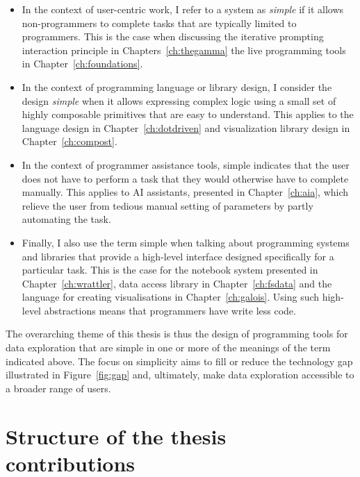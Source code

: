 \documentclass[fleqn,11pt]{report}
\theoremstyle{definition}
\newenvironment{nitemize}
{ \vspace{-0.4em}
  \begin{itemize}
    \setlength{\itemsep}{5pt}
    \setlength{\parskip}{0pt}
    \setlength{\parsep}{0pt} }
{ \end{itemize}
  \vspace{-0.4em} }
\begin{document}
\begin{nitemize}
\item In the context of user-centric work, I refer to a system as \emph{simple} if it allows
  non-programmers to complete tasks that are typically limited to programmers. This is the
  case when discussing the iterative prompting interaction principle in Chapters~\ref{ch:thegamma}
  the live programming tools in Chapter~\ref{ch:foundations}.

\item In the context of programming language or library design, I consider the design \emph{simple}
  when it allows expressing complex logic using a small set of highly composable primitives
  that are easy to understand. This applies to the language design in Chapter~\ref{ch:dotdriven}
  and visualization library design in Chapter~\ref{ch:compost}.

\item In the context of programmer assistance tools, simple indicates that the
  user does not have to perform a task that they would otherwise have to complete manually.
  This applies to AI assistants, presented in Chapter~\ref{ch:aia}, which relieve the user from
  tedious manual setting of parameters by partly automating the task.

\item Finally, I also use the term simple when talking about programming systems and libraries
  that provide a high-level interface designed specifically for a particular task. This is the
  case for the notebook system presented in Chapter~\ref{ch:wrattler}, data access library
  in Chapter~\ref{ch:fsdata} and the language for creating visualisations in Chapter~\ref{ch:galois}.
  Using such high-level abstractions means that programmers have write less code.
\end{nitemize}
\vspace{0.5em}

The overarching theme of this thesis is thus the design of programming tools for data exploration
that are simple in one or more of the meanings of the term indicated above. The focus on simplicity
aims to fill or reduce the technology gap illustrated in Figure~\ref{fig:gap} and, ultimately,
make data exploration accessible to a broader range of users.

\section{Structure of the thesis contributions}
\end{document}
